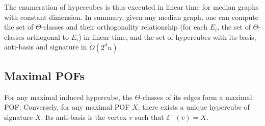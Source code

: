 \documentclass[a4paper,UKenglish,numberwithinsect,cleveref, autoref]{lipics-v2021}
\begin{document}
The enumeration of hypercubes is thus executed in linear time for median graphs with constant dimension. In summary, given any median graph, one can compute the set of $\Theta$-classes and their orthogonality relationship (for each $E_i$, the set of $\Theta$-classes orthogonal to $E_i$) in linear time, and the set of hypercubes with its basis, anti-basis and signature in $\tilde{O}(2^dn)$.

\subsection{Maximal POFs} \label{asubsec:max_pofs}

\begin{theorem}
For any maximal induced hypercube, the $\Theta$-classes of its edges form a maximal POF.
Conversely, for any maximal POF $X$, there exists a unique hypercube of signature $X$. Its anti-basis is the vertex $v$ such that $\mathcal{E}^-(v) = X$. 
\label{th:maximal_pofs}
\end{theorem}
\end{document}
